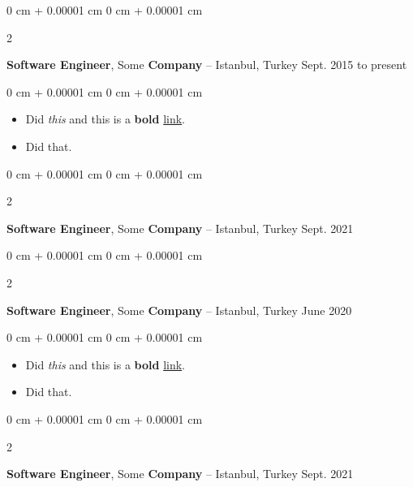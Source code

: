 \documentclass[10pt, letterpaper]{article}
\newenvironment{highlights}{
    \begin{itemize}[
        topsep=0.10 cm,
        parsep=0.10 cm,
        partopsep=0pt,
        itemsep=0pt,
        leftmargin=0 cm + 10pt
    ]
}{
    \end{itemize}
        
    \vspace{-0.10cm}
} %
\newenvironment{onecolentry}{
    \begin{adjustwidth}{
        0 cm + 0.00001 cm
    }{
        0 cm + 0.00001 cm
    }
}{
    \end{adjustwidth}
} %
\newenvironment{twocolentry}[2][]{
    \onecolentry
    \def\secondColumn{#2}
    \setcolumnwidth{\fill, 4.1 cm}
    \begin{paracol}{2}
}{
    \switchcolumn \raggedleft \secondColumn
    \end{paracol}
    \endonecolentry
} %
\begin{document}
        \begin{twocolentry}{
            Sept. 2015 to present
        }
            \textbf{Software Engineer}, Some \textbf{Company} -- Istanbul, Turkey\end{twocolentry}

        \vspace{0.10 cm}
        \begin{onecolentry}
            \begin{highlights}
                \item Did \textit{this} and this is a \textbf{bold} \href{https://example.com}{link}.
                \item Did that.
            \end{highlights}
        \end{onecolentry}


        \vspace{0.15 cm}

        \begin{twocolentry}{
            Sept. 2021
        }
            \textbf{Software Engineer}, Some \textbf{Company} -- Istanbul, Turkey\end{twocolentry}

        \vspace{0.10 cm}


        \vspace{0.15 cm}

        \begin{twocolentry}{
            June 2020
        }
            \textbf{Software Engineer}, Some \textbf{Company} -- Istanbul, Turkey\end{twocolentry}

        \vspace{0.10 cm}
        \begin{onecolentry}
            \begin{highlights}
                \item Did \textit{this} and this is a \textbf{bold} \href{https://example.com}{link}.
                \item Did that.
            \end{highlights}
        \end{onecolentry}


        \vspace{0.15 cm}

        \begin{twocolentry}{
            Sept. 2021
        }
            \textbf{Software Engineer}, Some \textbf{Company} -- Istanbul, Turkey\end{twocolentry}
\end{document}
